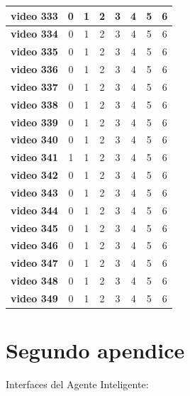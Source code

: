 \begin{table}[]
\begin{tabular}{c|c|c|c|c|c|c|c|}
\multicolumn{1}{|c|}{\textbf{video 333}} & 0 & 1 & 2 & 3 & 4 & 5 & 6 \\ \hline
\multicolumn{1}{|c|}{\textbf{video 334}} & 0 & 1 & 2 & 3 & 4 & 5 & 6 \\ \hline
\multicolumn{1}{|c|}{\textbf{video 335}} & 0 & 1 & 2 & 3 & 4 & 5 & 6 \\ \hline
\multicolumn{1}{|c|}{\textbf{video 336}} & 0 & 1 & 2 & 3 & 4 & 5 & 6 \\ \hline
\multicolumn{1}{|c|}{\textbf{video 337}} & 0 & 1 & 2 & 3 & 4 & 5 & 6 \\ \hline
\multicolumn{1}{|c|}{\textbf{video 338}} & 0 & 1 & 2 & 3 & 4 & 5 & 6 \\ \hline
\multicolumn{1}{|c|}{\textbf{video 339}} & 0 & 1 & 2 & 3 & 4 & 5 & 6 \\ \hline
\multicolumn{1}{|c|}{\textbf{video 340}} & 0 & 1 & 2 & 3 & 4 & 5 & 6 \\ \hline
\multicolumn{1}{|c|}{\textbf{video 341}} & 1 & 1 & 2 & 3 & 4 & 5 & 6 \\ \hline
\multicolumn{1}{|c|}{\textbf{video 342}} & 0 & 1 & 2 & 3 & 4 & 5 & 6 \\ \hline
\multicolumn{1}{|c|}{\textbf{video 343}} & 0 & 1 & 2 & 3 & 4 & 5 & 6 \\ \hline
\multicolumn{1}{|c|}{\textbf{video 344}} & 0 & 1 & 2 & 3 & 4 & 5 & 6 \\ \hline
\multicolumn{1}{|c|}{\textbf{video 345}} & 0 & 1 & 2 & 3 & 4 & 5 & 6 \\ \hline
\multicolumn{1}{|c|}{\textbf{video 346}} & 0 & 1 & 2 & 3 & 4 & 5 & 6 \\ \hline
\multicolumn{1}{|c|}{\textbf{video 347}} & 0 & 1 & 2 & 3 & 4 & 5 & 6 \\ \hline
\multicolumn{1}{|c|}{\textbf{video 348}} & 0 & 1 & 2 & 3 & 4 & 5 & 6 \\ \hline
\multicolumn{1}{|c|}{\textbf{video 349}} & 0 & 1 & 2 & 3 & 4 & 5 & 6 \\ \hline
\end{tabular}
\end{table}

\chapter{Segundo apendice}
Interfaces del Agente Inteligente:
\vskip 0.1cm

